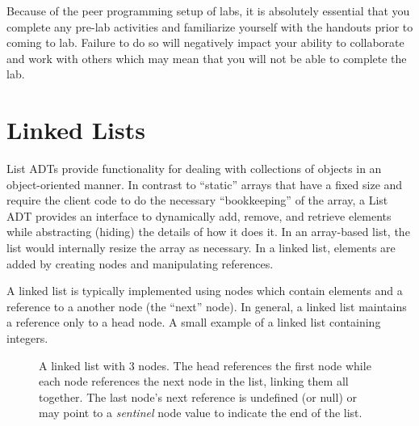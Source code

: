 \documentclass[12pt]{scrartcl}
\begin{document}
Because of the peer programming setup of labs, it is absolutely 
essential that you complete any pre-lab activities and familiarize
yourself with the handouts prior to coming to lab.  Failure to do
so will negatively impact your ability to collaborate and work with 
others which may mean that you will not be able to complete the
lab.  

\section*{Linked Lists}

List ADTs provide functionality for dealing with collections of 
objects in an object-oriented manner.  In contrast to ``static'' 
arrays that have a fixed size and require the client code to do
the necessary ``bookkeeping'' of the array, a List ADT provides 
an interface to dynamically add, remove, and retrieve elements 
while abstracting (hiding) the details of how it does it.  In 
an array-based list, the list would internally resize the array 
as necessary.  In a linked list, elements are added by creating 
nodes and manipulating references. 

A linked list is typically implemented using nodes which contain 
elements and a reference to a another node (the ``next'' node).  
In general, a linked list maintains a reference only to a head 
node.  A small example of a linked list containing integers. 
 
\begin{figure}[h]
\centering
{}
\caption{A linked list with 3 nodes.  The head references the
first node while each node references the next node in the list, 
linking them all together.  The last node's next reference is
undefined (or null) or may point to a \emph{sentinel} node value
to indicate the end of the list.}
\label{figure:linkedList}
\end{figure}
\end{document}
